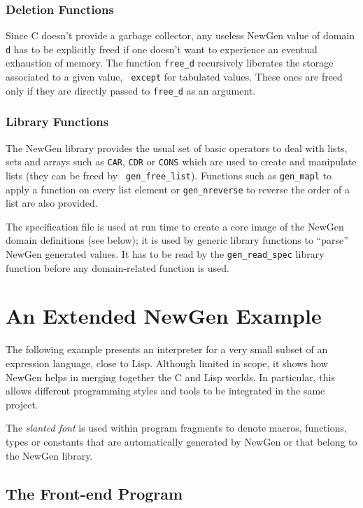 \subsubsection*{Deletion Functions}
Since C doesn't provide a garbage collector, any useless NewGen value of
domain {\tt d} has to be explicitly freed if one doesn't want to
experience an eventual exhaustion of memory. The function {\tt free\_d}
recursively liberates the storage associated to a given value, {\tt
except} for tabulated values. These ones are freed only if they are
directly passed to {\tt free\_d} as an argument.

\subsubsection*{Library Functions}
The NewGen library provides the usual set of basic operators to deal
with lists, sets and arrays such as {\tt CAR}, {\tt CDR} or {\tt CONS}
which are used to create and manipulate lists (they can be freed by {\tt
gen\_free\_list}). Functions such as {\tt gen\_mapl} to apply a function
on every list element or {\tt gen\_nreverse} to reverse the order of a
list are also provided.

The specification file is used at run time to create a core image of the
NewGen domain definitions (see below); it is used by generic library
functions to ``{parse}'' NewGen generated values. It has to be read by
the {\tt gen\_read\_spec} library function before any domain-related
function is used.

\section{An Extended NewGen Example}

The following example presents an interpreter for a very small subset of
an expression language, close to Lisp.  Although limited in scope, it
shows how NewGen helps in merging together the C and Lisp worlds. In
particular, this allows different programming styles and tools to be
integrated in the same project.

The {\sl slanted font} is used within program fragments to
denote macros, functions, types or constants that are automatically
generated by NewGen or that belong to the NewGen library.

\subsection{The Front-end Program}

